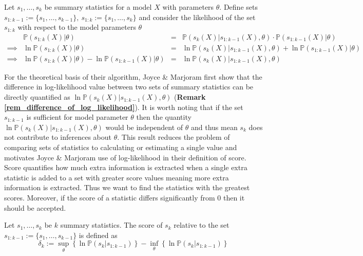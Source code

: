 \documentclass[11pt,a4paper]{article}
\newcommand*{\prob}{\mathbb{P}}
\theoremstyle{break}
\begin{document}
  \begin{box_remark}\label{rem_difference_of_log_likelihood}
    Let $s_1,\dots,s_k$ be summary statistics for a model $X$ with parameters $\theta$. Define sets $s_{1:k-1}:=\{s_1,\dots,s_{k-1}\},\ s_{1:k}:=\{s_1,\dots,s_k\}$ and consider the likelihood of the set $s_{1:k}$ with respect to the model parameters $\theta$
    \[\begin{array}{rrcl}
    &\prob(s_{1:k}(X)|\theta)&=&\prob(s_k(X)|s_{1:k-1}(X),\theta)\cdot\prob(s_{1:k-1}(X)|\theta)\\
    \implies&\ln\prob(s_{1:k}(X)|\theta)&=&\ln\prob(s_k(X)|s_{1:k-1}(X),\theta)+\ln\prob(s_{1:k-1}(X)|\theta)\\
    \implies&\ln\prob(s_{1:k}(X)|\theta)-\ln\prob(s_{1:k-1}(X)|\theta)&=&\ln\prob(s_k(X)|s_{1:k-1}(X),\theta)
    \end{array}\]
  \end{box_remark}

  \par For the theoretical basis of their algorithm, Joyce \& Marjoram first show that the difference in log-likelihood value between two sets of summary statistics can be directly quantified as $\ln\prob(s_k(X)|s_{1:k-1}(X),\theta)$ (\textbf{Remark \ref{rem_difference_of_log_likelihood}}). It is worth noting that if the set $s_{1:k-1}$ is sufficient for model parameter $\theta$ then the quantity $\ln\prob(s_k(X)|s_{1:k-1}(X),\theta)$ would be independent of $\theta$ and thus mean $s_k$ does not contribute to inferences about $\theta$. This result reduces the problem of comparing sets of statistics to calculating or estimating a single value and motivates Joyce \& Marjoram use of log-likelihood in their definition of score. Score quantifies how much extra information is extracted when a single extra statistic is added to a set with greater score values meaning more extra information is extracted. Thus we want to find the statistics with the greatest scores. Moreover, if the score of a statistic differs significantly from 0 then it should be accepted.

  \begin{box_definition}\label{def_score}
    Let $s_1,\dots,s_k$ be $k$ summary statistics. The score of $s_k$ relative to the set $s_{1:k-1}:=\{s_1,\dots,s_{k-1}\}$ is defined as
    \[ \delta_k:=\sup_\theta\left\{\ln\prob(s_k|s_{1:k-1})\right\}-\inf_\theta\left\{\ln\prob(s_k|s_{1:k-1})\right\} \]
  \end{box_definition}
\end{document}
